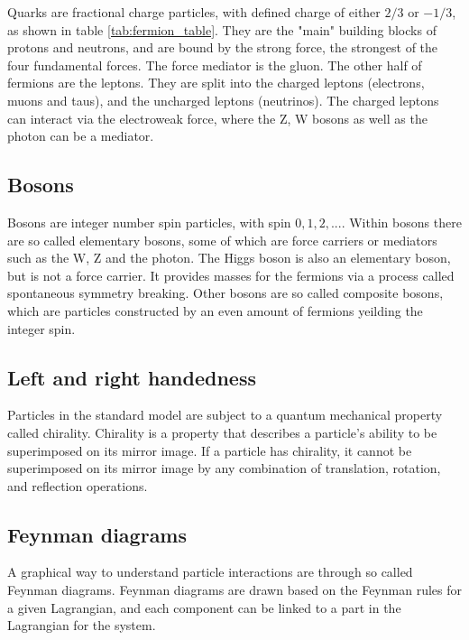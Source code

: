 Quarks are fractional charge particles, with defined charge of either $2/3$ or $-1/3$, as shown in table \ref{tab:fermion_table}. They are the "main" building blocks of protons and neutrons, and are bound by the strong 
force, the strongest of the four fundamental forces. The force mediator is the gluon. The other half of fermions are the leptons. They are split into the charged 
leptons (electrons, muons and taus), and the uncharged leptons (neutrinos). The charged leptons can interact via the electroweak force, where the Z, W bosons 
as well as the photon can be a mediator.


\subsection*{Bosons}
Bosons are integer number spin particles, with spin $0, 1, 2, ...$. Within bosons there are so called elementary bosons, some of which are force carriers or mediators such as the W, Z and the photon.
The Higgs boson is also an elementary boson, but is not a force carrier. It provides masses for the fermions via a process called spontaneous symmetry breaking\cite{Pich:819632}. Other 
bosons are so called composite bosons, which are particles constructed by an even amount of fermions yeilding the integer spin. 

\subsection*{Left and right handedness}
Particles in the standard model are subject to a quantum mechanical property called chirality. 
Chirality is a property that describes a particle's ability to be superimposed on its mirror image. 
If a particle has chirality, it cannot be superimposed on its mirror image by any combination of translation, 
rotation, and reflection operations. \cite{weinberg_1995}

\subsection*{Feynman diagrams}
A graphical way to understand particle interactions are through so called Feynman diagrams. Feynman diagrams are drawn based on the Feynman rules for a given Lagrangian\cite{Pich:819632}\cite{feynrules}, and each component 
can be linked to a part in the Lagrangian for the system. 


